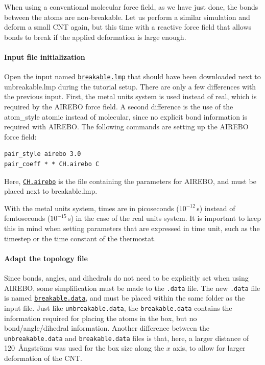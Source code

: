 \documentclass[9pt,tutorial]{livecoms}
\newcommand{\lmpcmd}[1]{\hspace{0pt}\colorbox{listing}{\textcolor{command}{\small{#1}}}\hspace{0pt}} %
\newcommand{\lmpcmdnote}[1]{\hspace{0pt}\colorbox{note_listing}{\textcolor{command}{\small{#1}}}\hspace{0pt}} %
\newcommand{\flecmd}[1]{\textcolor{command}{\texttt{#1}}} %
\newcommand{\dwlcmd}[1]{\textcolor{download}{\texttt{#1}}} %
\newcommand{\filepath}{https://raw.githubusercontent.com/lammpstutorials/lammpstutorials-article/main/files/}
\begin{document}
When using a conventional molecular force field, as we have just done, the bonds between the atoms
are non-breakable.  Let us perform a similar simulation and deform a small
CNT again, but this time with a reactive force field that allows bonds
to break if the applied deformation is large enough.

\paragraph{Input file initialization}

Open the input named 
\href{\filepath tutorial2/breakable.lmp}{\dwlcmd{breakable.lmp}} that should have
been downloaded next to \lmpcmd{unbreakable.lmp} during the tutorial setup.
There are only a few differences with the previous input.  First, the \lmpcmd{metal}
units system is used instead of \lmpcmd{real}, which is
required by the AIREBO force field.  A second difference is the use of the
\lmpcmd{atom\_style atomic} instead of \lmpcmd{molecular}, since no explicit
bond information is required with AIREBO.  The following commands are
setting up the AIREBO force field:
\begin{lstlisting}
pair_style airebo 3.0
pair_coeff * * CH.airebo C
\end{lstlisting}
Here, \href{\filepath tutorial2/CH.airebo}{\dwlcmd{CH.airebo}} is the file
containing the parameters for AIREBO, and must be placed next
to \lmpcmd{breakable.lmp}.

\begin{note}
  With the \lmpcmdnote{metal} units system, times are in picoseconds ($10^{-12}$\,s)
  instead of femtoseconds ($10^{-15}$\,s) in the case of the \lmpcmdnote{real} units system.
  It is important to keep this in mind when setting parameters that are expressed
  in time unit, such as the timestep or the time constant of the thermostat.
\end{note}

\paragraph{Adapt the topology file}

Since bonds, angles, and dihedrals do not need to be
explicitly set when using AIREBO, some simplification must be made to the
\flecmd{.data} file.  The new \flecmd{.data}
file is named \href{\filepath tutorial2/breakable.data}{\dwlcmd{breakable.data}},
and must be placed within the same folder as the input file.  Just like \flecmd{unbreakable.data},
the \flecmd{breakable.data} contains the information
required for placing the atoms in the box, but no bond/angle/dihedral information.
Another difference between the \flecmd{unbreakable.data} and \flecmd{breakable.data} files
is that, here, a larger distance of 120~Ångströms was used for the box size along
the $x$ axis, to allow for larger deformation of the CNT.
\end{document}
